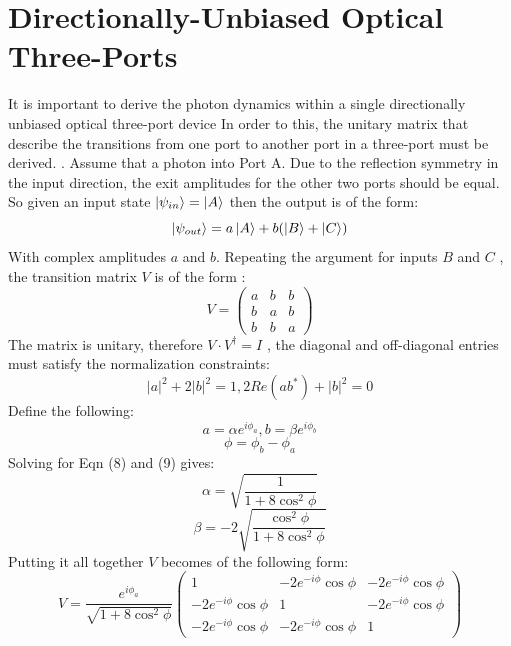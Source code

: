 \section{Directionally-Unbiased Optical Three-Ports}
It is important to derive the photon dynamics within a single directionally unbiased optical three-port device In order to this, the unitary matrix that describe the transitions from one port to another port in a three-port must be derived. \cite{PhysRevA.93.043845}. 
\newline
Assume that a photon into Port A. Due to the reflection symmetry in the input direction, the exit amplitudes for the other two ports should be equal. So given an input state $\ket{\psi_{in}} = \ket{A}$ then the output is of the form:
\begin{equation}
    \ket{\psi_{out}} = a\ket{A} + b(\ket{B} + \ket{C})
\end{equation}
With complex amplitudes $a$ and $b$. Repeating the argument for inputs $B$ and $C$ , the transition matrix $V$ is of the form :
\begin{equation}
    V = \begin{pmatrix}
    a & b & b \\
    b & a & b \\
    b & b & a 
    \end{pmatrix}
\end{equation}
The matrix is unitary, therefore $V \cdot V^{\dagger} = I$ , the diagonal and off-diagonal entries must satisfy the normalization constraints: 
\begin{equation}
    |a|^2 + 2|b|^2 = 1 , 2Re(ab^{*}) + |b|^2 = 0 
\end{equation}
Define the following:
\begin{equation}
    a = \alpha e^{i\phi_{a}}, b = \beta e^{i\phi_{b}}
\end{equation}
\begin{equation}
    \phi = \phi_{b} - \phi_{a}
\end{equation}
Solving for Eqn (8) and (9) gives:
\begin{equation}
    \alpha = \sqrt{\frac{1}{1 + 8\cos^{2}\phi}}
\end{equation}
\begin{equation}
    \beta = -2 \sqrt{\frac{\cos^{2}\phi}{1+8\cos^{2}\phi}}
\end{equation}
Putting it all together $V$ becomes of the following form:
\begin{equation}
    V = \frac{e^{i\phi_{a}}}{\sqrt{1+8\cos^{2} \phi}} 
    \begin{pmatrix}
    1 & -2 e^{-i\phi}\cos\phi & -2e^{-i\phi}\cos\phi \\
    -2e^{-i\phi}\cos\phi & 1 & -2e^{-i\phi}\cos\phi \\
    -2e^{-i\phi}\cos\phi & -2e^{-i\phi}\cos\phi & 1 
    \end{pmatrix}
\end{equation}
